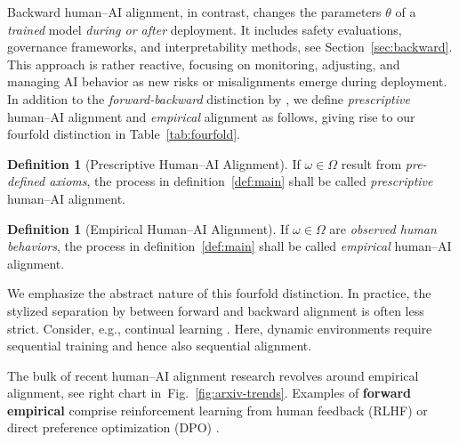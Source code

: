 \documentclass{article}
\theoremstyle{plain}
\theoremstyle{definition}
\newtheorem{definition}[theorem]{Definition}
\theoremstyle{remark}
\begin{document}
Backward human--AI alignment, in contrast, %
changes the parameters $\theta$ of a \textit{trained} model %
\textit{during or after} deployment. It includes safety evaluations, governance frameworks, and interpretability methods, see Section~\ref{sec:backward}. %
This approach is rather reactive, focusing on monitoring, adjusting, and managing AI behavior as new risks or misalignments emerge during deployment.
%
In addition to the \textit{forward-backward} distinction by \citet{ji2023ai}, we define \textit{prescriptive} human--AI alignment and \textit{empirical} alignment as follows, giving rise to our fourfold distinction in Table~\ref{tab:fourfold}. 
%
\begin{definition}[Prescriptive Human--AI Alignment]\label{def:prescr}
    If $\omega \in \Omega$ result from \textit{pre-defined axioms}, the process in definition~\ref{def:main} shall be called \textit{prescriptive} human--AI alignment. 
\end{definition}
%
\begin{definition}[Empirical Human--AI Alignment]\label{def:emp-align}
    If $\omega \in \Omega$ are \textit{observed human behaviors}, the process in definition~\ref{def:main} shall be called \textit{empirical} human--AI alignment. 
\end{definition}
%

We emphasize the abstract nature of this fourfold distinction. In practice, the stylized separation by \citet{ji2023ai} between forward and backward alignment is often less strict. Consider, e.g., continual learning \cite{shin2017continual,kirkpatrick2017overcoming,parisi2019continual,lopez2017gradient}. Here, dynamic environments require sequential training and hence also sequential alignment. %
%

The bulk of recent human--AI alignment research revolves around empirical alignment, see right chart in~Fig.~\ref{fig:arxiv-trends}. %
Examples of \textbf{forward empirical} comprise reinforcement learning from human feedback (RLHF) \cite{christiano2023deepreinforcementlearninghuman,stiennon2020learning, nakano2021webgpt,
ouyang2022training, bai2022training, glaese2022improving} or direct preference optimization (DPO) \cite{rafailov2023dpo,richardson2024logic,tang2024stochastic, afzali2024aligning, wang2024survey, gupta2024context, yin2024sparse, li2024montessori}. 
\end{document}
